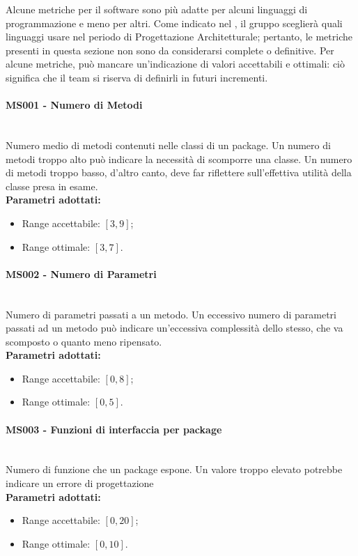 Alcune metriche per il software sono più adatte per alcuni linguaggi di programmazione e meno per altri. Come indicato nel \PdP , il gruppo \gruppo \space sceglierà quali linguaggi usare nel periodo di Progettazione Architetturale; pertanto, le metriche presenti in questa sezione non sono da considerarsi complete o definitive.\newline
Per alcune metriche, può mancare un'indicazione di valori accettabili e ottimali: ciò significa che il team si riserva di definirli in futuri incrementi.

\paragraph{MS001 - Numero di Metodi}\mbox{}\\[0,3cm]
Numero medio di metodi contenuti nelle classi di un package. Un numero di metodi troppo alto può indicare la necessità di scomporre una classe. Un numero di metodi troppo basso, d'altro canto, deve far riflettere sull'effettiva utilità della classe presa in esame.\\[0,2cm]
\textbf{Parametri adottati:}
\begin{itemize}
	\item Range accettabile: $[3,9]$;
	\item Range ottimale: $[3,7]$.
\end{itemize}

\paragraph{MS002 - Numero di Parametri}\mbox{}\\[0,3cm]
Numero di parametri passati a un metodo. Un eccessivo numero di parametri passati ad un metodo può indicare un'eccessiva complessità dello stesso, che va scomposto o quanto meno ripensato.\\[0,2cm]
\textbf{Parametri adottati:}
\begin{itemize}
	\item Range accettabile: $[0,8]$;
	\item Range ottimale: $[0,5]$.
\end{itemize}

\paragraph{MS003 - Funzioni di interfaccia per package}\mbox{}\\[0,3cm]
Numero di funzione che un package espone. Un valore troppo elevato potrebbe indicare un errore di progettazione\\[0,2cm]
\textbf{Parametri adottati:}
\begin{itemize}
	\item Range accettabile: $[0,20]$;
	\item Range ottimale: $[0,10]$.
\end{itemize}

